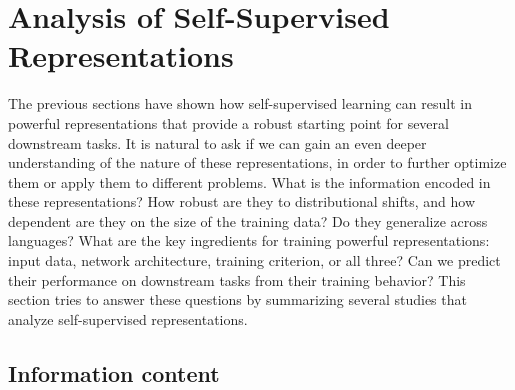 
\section{Analysis of Self-Supervised Representations}
\label{analysis}

The previous sections have shown how self-supervised learning can result in
powerful representations that provide a robust starting point for several
downstream tasks. It is natural to ask if we can gain an even deeper
understanding of the nature of these representations, in order to further
optimize them or apply them to different problems.
What is the information encoded in these representations? How robust are they
to distributional shifts, and how dependent are they on the size of the
training data? Do they generalize across languages? What are the key
ingredients for training powerful representations: input data, network
architecture, training criterion, or all three? Can we predict their
performance on downstream tasks from their training behavior? This section
tries to answer these questions by summarizing several studies that analyze
self-supervised representations.

\subsection{Information content}

